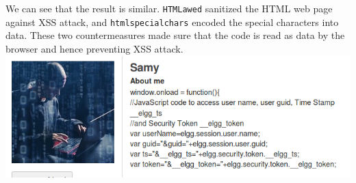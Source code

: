 \documentclass[a4paper]{article}
\begin{document}
We can see that the result is similar. \verb+HTMLawed+ sanitized the HTML web page against XSS attack, and \verb+htmlspecialchars+ encoded the special characters into data. These two countermeasures made sure that the code is read as data by the browser and hence preventing XSS attack.
\includegraphics[scale=0.7]{2/28.png}\\\\
\end{document}

